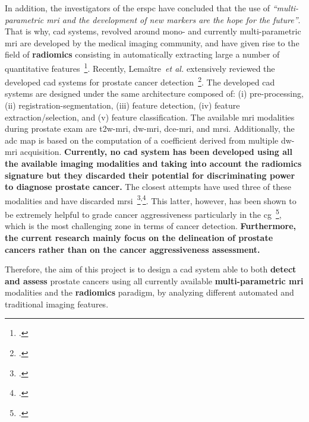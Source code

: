 In addition, the investigators of the \ac{erspc} have concluded that the use of \emph{``multi-parametric \ac{mri} and the development of new markers are the hope for the future''}.
That is why, \ac{cad} systems, revolved around mono- and currently multi-parametric \ac{mri} are developed by the medical imaging community, and have given rise to the field of \textbf{radiomics} consisting in automatically extracting large a number of quantitative features~\footcite{lambin2012radiomics}.
Recently, Lema\^itre~\emph{et al.} extensively reviewed the developed \ac{cad} systems for prostate cancer detection~\footcite{Lemaitre2015}.
The developed \ac{cad} systems are designed under the same architecture composed of: (i) pre-processing, (ii) registration-segmentation, (iii) feature detection, (iv) feature extraction/selection, and (v) feature classification.
The available \ac{mri} modalities during prostate exam are \ac{t2w}-\ac{mri}, \ac{dw}-\ac{mri}, \ac{dce}-\ac{mri}, and \ac{mrsi}. 
Additionally, the \ac{adc} map is based on the computation of a coefficient derived from multiple \ac{dw}-\ac{mri} acquisition.
\textbf{Currently, no \ac{cad} system has been developed using all the available imaging modalities and taking into account the radiomics signature but they discarded their potential for discriminating power to diagnose prostate cancer.}
The closest attempts have used three of these modalities and have discarded \ac{mrsi}~\footcite{Litjens2014}\textsuperscript{,}\footcite{Viswanath2011}.
This latter, however, has been shown to be extremely helpful to grade cancer aggressiveness particularly in the \ac{cg}~\footcite{Vos2015}, which is the most challenging zone in terms of cancer detection.
\textbf{Furthermore, the current research mainly focus on the delineation of prostate cancers rather than on the cancer aggressiveness assessment.}

% 

Therefore, the aim of this project is to design a \ac{cad} system able to both \textbf{detect and assess} prostate cancers using all currently available \textbf{multi-parametric \ac{mri}} modalities and the \textbf{radiomics} paradigm, by analyzing different automated and traditional imaging features.

